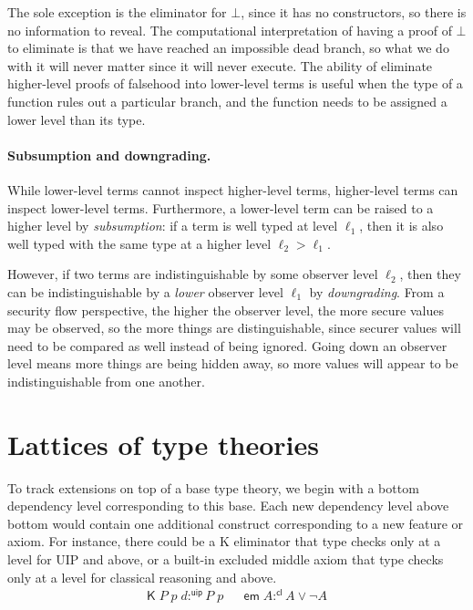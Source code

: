 \documentclass{article}
\newcommand{\kw}[1]{\mathsf{#1}}
\begin{document}
The sole exception is the eliminator for $\bot$,
since it has no constructors, so there is no information to reveal.
The computational interpretation of having a proof of $\bot$ to eliminate
is that we have reached an impossible dead branch,
so what we do with it will never matter since it will never execute.
The ability of eliminate higher-level proofs of falsehood into lower-level terms
is useful when the type of a function rules out a particular branch,
and the function needs to be assigned a lower level than its type.

\paragraph{Subsumption and downgrading.}
While lower-level terms cannot inspect higher-level terms,
higher-level terms can inspect lower-level terms.
Furthermore, a lower-level term can be raised to a higher level by \emph{subsumption}:
if a term is well typed at level $\ell_1$,
then it is also well typed with the same type at a higher level $\ell_2 > \ell_1$.

However, if two terms are indistinguishable by some observer level $\ell_2$,
then they can be indistinguishable by a \emph{lower} observer level $\ell_1$ by \emph{downgrading}.
From a security flow perspective, the higher the observer level,
the more secure values may be observed,
so the more things are distinguishable,
since securer values will need to be compared as well instead of being ignored.
Going down an observer level means more things are being hidden away,
so more values will appear to be indistinguishable from one another.

\section{Lattices of type theories} \label{sec:lattice}

To track extensions on top of a base type theory,
we begin with a bottom dependency level corresponding to this base.
Each new dependency level above bottom would contain one additional construct
corresponding to a new feature or axiom.
For instance, there could be a K eliminator that type checks
only at a level for UIP and above,
or a built-in excluded middle axiom that type checks
only at a level for classical reasoning and above.
%
\begin{align*}
  \kw{K} \; P \; p \; d :^{\kw{uip}} P \; p &&
  \kw{em} \; A :^{\kw{cl}} A \vee \neg A
\end{align*}
\vspace{-1.5\baselineskip}
\end{document}
